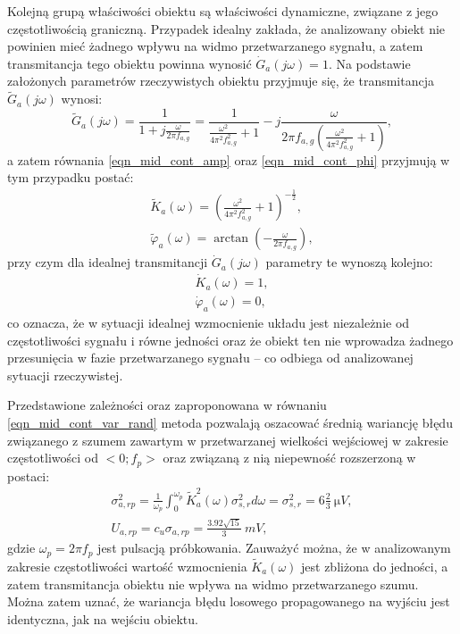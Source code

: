 Kolejną grupą właściwości obiektu są właściwości dynamiczne, związane z jego częstotliwością graniczną. Przypadek idealny zakłada, że analizowany obiekt nie powinien mieć żadnego wpływu na widmo przetwarzanego sygnału, a zatem transmitancja tego obiektu powinna wynosić $\dot{G}_{a}(j\omega) = 1$. Na podstawie założonych parametrów rzeczywistych obiektu przyjmuje się, że transmitancja $\tilde{G}_{a}(j\omega)$ wynosi:
\begin{equation}
\tilde{G}_{a}(j\omega) = \frac{1}{1 + j \frac{\omega}{2 \pi f_{a,g}}} = \frac{1}{\frac{\omega^{2}}{4 \pi^{2} f_{a,g}^{2}} + 1} - j \frac{\omega}{2 \pi f_{a,g} \left( \frac{\omega^{2}}{4 \pi^{2} f_{a,g}^{2}} + 1 \right) } \label{eqn_sym_parta_trans},
\end{equation}
a zatem równania \eqref{eqn_mid_cont_amp} oraz \eqref{eqn_mid_cont_phi} przyjmują w tym przypadku postać:
\begin{gather}
\tilde{K}_{a}(\omega) = \left( \frac{\omega^{2}}{4 \pi^{2} f_{a,g}^{2}} + 1 \right)^{-\frac{1}{2}} \label{eqn_sym_parta_amp_real}, \\
\tilde{\varphi}_{a}(\omega) = \arctan \left( -\frac{\omega}{2 \pi f_{a,g}} \right) \label{eqn_sym_parta_phi_real},
\end{gather}
przy czym dla idealnej transmitancji $\dot{G}_{a}(j\omega)$ parametry te wynoszą kolejno:
\begin{gather}
\dot{K}_{a}(\omega) = 1 \label{eqn_sym_parta_amp_ideal}, \\
\dot{\varphi}_{a}(\omega) = 0  \label{eqn_sym_parta_phi_ideal},
\end{gather}
co oznacza, że w sytuacji idealnej wzmocnienie układu jest niezależnie od częstotliwości sygnału i równe jedności oraz że obiekt ten nie wprowadza żadnego przesunięcia w fazie przetwarzanego sygnału -- co odbiega od analizowanej sytuacji rzeczywistej.

Przedstawione zależności oraz zaproponowana w równaniu \eqref{eqn_mid_cont_var_rand} metoda pozwalają oszacować średnią wariancję błędu związanego z szumem zawartym w przetwarzanej wielkości wejściowej w zakresie częstotliwości od $<0;f_{p}>$ oraz związaną z nią niepewność rozszerzoną w postaci:
\begin{gather}
\sigma_{a,rp}^{2} = \frac{1}{\omega_{p}} \int _{0} ^{\omega_{p}} \tilde{K}_{a}^{2}(\omega) \sigma_{s,r}^{2} d\omega = \sigma_{s,r}^{2} = 6 \frac{2}{3} ~\unit{\micro V} \label{eqn_sym_parta_rand_prop_var}, \\
U_{a,rp} = c_{u} \sigma_{a,rp} = \frac{3.92 \sqrt{15}}{3} ~\unit{mV} \label{eqn_sym_parta_rand_prop_unc},
\end{gather}
gdzie $\omega_{p} = 2 \pi f_{p}$ jest pulsacją próbkowania. Zauważyć można, że w analizowanym zakresie częstotliwości wartość wzmocnienia $\tilde{K}_{a}(\omega)$ jest zbliżona do jedności, a zatem transmitancja obiektu nie wpływa na widmo przetwarzanego szumu. Można zatem uznać, że wariancja błędu losowego propagowanego na wyjściu jest identyczna, jak na wejściu obiektu.

